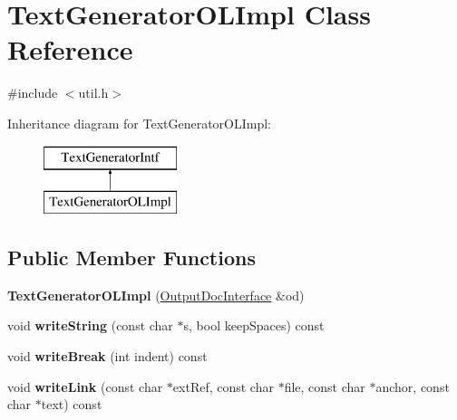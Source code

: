 \hypertarget{class_text_generator_o_l_impl}{}\section{Text\+Generator\+O\+L\+Impl Class Reference}
\label{class_text_generator_o_l_impl}


{\ttfamily \#include $<$util.\+h$>$}

Inheritance diagram for Text\+Generator\+O\+L\+Impl\+:\begin{figure}[H]
\begin{center}
\leavevmode
\includegraphics[height=2.000000cm]{class_text_generator_o_l_impl}
\end{center}
\end{figure}
\subsection*{Public Member Functions}
\begin{DoxyCompactItemize}
\item 
\mbox{\label{class_text_generator_o_l_impl_aaa9f4eb087cfa289b62697719b5f712e}} 
{\bfseries Text\+Generator\+O\+L\+Impl} (\mbox{\hyperlink{class_output_doc_interface}{Output\+Doc\+Interface}} \&od)
\item 
\mbox{\label{class_text_generator_o_l_impl_a0a3b8bf95cf513fd765edd22995a97ee}} 
void {\bfseries write\+String} (const char $\ast$s, bool keep\+Spaces) const
\item 
\mbox{\label{class_text_generator_o_l_impl_aacdc491d13822ba5ed23de744892f1f9}} 
void {\bfseries write\+Break} (int indent) const
\item 
\mbox{\label{class_text_generator_o_l_impl_a6a16bd80dc0a86be5ba923c64305b807}} 
void {\bfseries write\+Link} (const char $\ast$ext\+Ref, const char $\ast$file, const char $\ast$anchor, const char $\ast$text) const
\end{DoxyCompactItemize}


